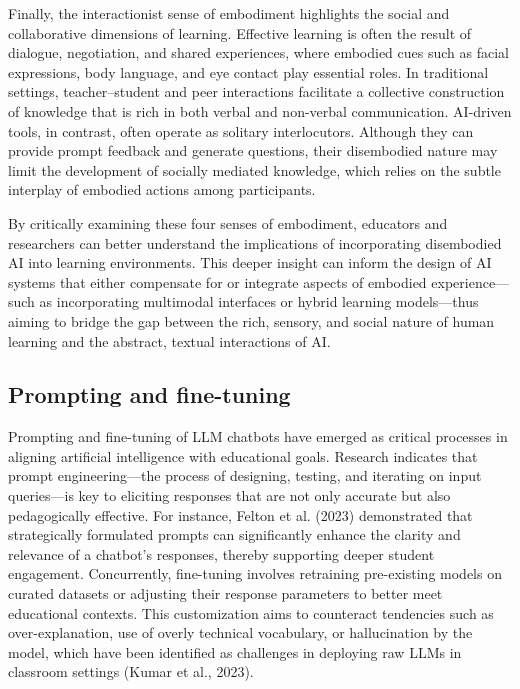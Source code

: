 \documentclass[pdflatex,sn-apa]{sn-jnl}%
\theoremstyle{thmstyleone}%
\theoremstyle{thmstyletwo}%
\theoremstyle{thmstylethree}%
\begin{document}
Finally, the interactionist sense of embodiment highlights the social and collaborative dimensions of learning. Effective learning is often the result of dialogue, negotiation, and shared experiences, where embodied cues such as facial expressions, body language, and eye contact play essential roles. In traditional settings, teacher–student and peer interactions facilitate a collective construction of knowledge that is rich in both verbal and non-verbal communication. AI-driven tools, in contrast, often operate as solitary interlocutors. Although they can provide prompt feedback and generate questions, their disembodied nature may limit the development of socially mediated knowledge, which relies on the subtle interplay of embodied actions among participants.

By critically examining these four senses of embodiment, educators and researchers can better understand the implications of incorporating disembodied AI into learning environments. This deeper insight can inform the design of AI systems that either compensate for or integrate aspects of embodied experience—such as incorporating multimodal interfaces or hybrid learning models—thus aiming to bridge the gap between the rich, sensory, and social nature of human learning and the abstract, textual interactions of AI.

\subsection{Prompting and fine-tuning}
Prompting and fine-tuning of LLM chatbots have emerged as critical processes in aligning artificial intelligence with educational goals. Research indicates that prompt engineering—the process of designing, testing, and iterating on input queries—is key to eliciting responses that are not only accurate but also pedagogically effective. For instance, Felton et al. (2023) demonstrated that strategically formulated prompts can significantly enhance the clarity and relevance of a chatbot’s responses, thereby supporting deeper student engagement. Concurrently, fine-tuning involves retraining pre-existing models on curated datasets or adjusting their response parameters to better meet educational contexts. This customization aims to counteract tendencies such as over-explanation, use of overly technical vocabulary, or hallucination by the model, which have been identified as challenges in deploying raw LLMs in classroom settings (Kumar et al., 2023).
\end{document}
